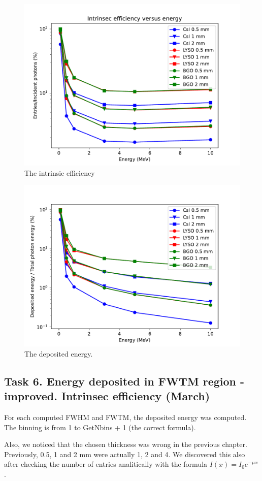 \documentclass{article}
\begin{document}
\begin{figure}[H]
    \centering
    \includegraphics[width=0.8\linewidth]{images/task5/intrinsic_eff.pdf}
    \caption{The intrinsic efficiency}
\end{figure}
\begin{figure}[H]
    \centering
    \includegraphics[width=0.8\linewidth]{images/task5/edep_versus_total.pdf}
    \caption{The deposited energy.}
\end{figure}

\subsection{Task 6. Energy deposited in FWTM region - improved. Intrinsec efficiency (March)}

For each computed FWHM and FWTM, the deposited energy was computed. The binning is from 1 to GetNbins + 1 (the correct formula).

Also, we noticed that the chosen thickness was wrong in the previous chapter. Previously, 0.5, 1 and 2 mm were actually 1, 2 and 4. 
We discovered this also after checking the number of entries analitically with the formula $I(x) = I_0 e^{-\mu x}$.
\end{document}
